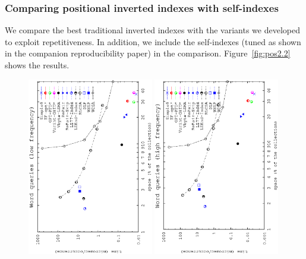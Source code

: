 \documentclass[review]{elsarticle}
\begin{document}
\subsubsection{Comparing positional inverted indexes with self-indexes} \label{exp:pos:ours}

We compare the best traditional inverted indexes with the variants we developed to exploit repetitiveness. In addition,
we include the self-indexes (tuned as shown in the companion reproducibility paper) in the comparison. Figure~\ref{fig:pos2.2} shows the results.

\begin{figure}[t]
\begin{center}
\includegraphics[angle=-90,width=0.49\textwidth]{../figures/f4/words1-1000/locate-words1-1000.eps}
\includegraphics[angle=-90,width=0.49\textwidth]{../figures/f4/words1001-100k/locate-words1001-100k.eps}

\end{center}
\end{figure}
\end{document}

